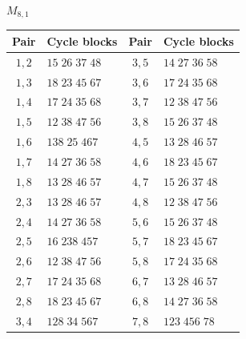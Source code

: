 \documentclass[11pt,a4paper]{article}
\theoremstyle{plain}
\theoremstyle{definition}
\numberwithin{equation}{section}
\begin{document}
\begin{center}\small
$M_{8,1}$\par\nopagebreak[4]\smallskip\nopagebreak[4]
\begin{tabular}{cl@{\qquad}cl}\toprule Pair&Cycle blocks&Pair&Cycle blocks\\\midrule
$1,2$ & $15\;26\;37\;48$ & $3,5$ & $14\;27\;36\;58$ \\
$1,3$ & $18\;23\;45\;67$ & $3,6$ & $17\;24\;35\;68$ \\
$1,4$ & $17\;24\;35\;68$ & $3,7$ & $12\;38\;47\;56$ \\
$1,5$ & $12\;38\;47\;56$ & $3,8$ & $15\;26\;37\;48$ \\
$1,6$ & $138\;25\;467$ & $4,5$ & $13\;28\;46\;57$ \\
$1,7$ & $14\;27\;36\;58$ & $4,6$ & $18\;23\;45\;67$ \\
$1,8$ & $13\;28\;46\;57$ & $4,7$ & $15\;26\;37\;48$ \\
$2,3$ & $13\;28\;46\;57$ & $4,8$ & $12\;38\;47\;56$ \\
$2,4$ & $14\;27\;36\;58$ & $5,6$ & $15\;26\;37\;48$ \\
$2,5$ & $16\;238\;457$ & $5,7$ & $18\;23\;45\;67$ \\
$2,6$ & $12\;38\;47\;56$ & $5,8$ & $17\;24\;35\;68$ \\
$2,7$ & $17\;24\;35\;68$ & $6,7$ & $13\;28\;46\;57$ \\
$2,8$ & $18\;23\;45\;67$ & $6,8$ & $14\;27\;36\;58$ \\
$3,4$ & $128\;34\;567$ & $7,8$ & $123\;456\;78$ \\
\bottomrule\end{tabular}
\end{center}

\endgroup
\end{document}
